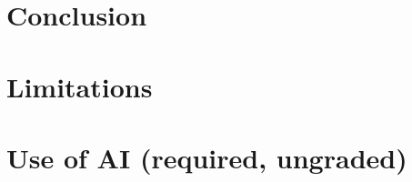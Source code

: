 \documentclass[11pt]{article}
\begin{document}
\section{Conclusion}

\section*{Limitations}

\section*{Use of AI (required, ungraded)}


\end{document}
